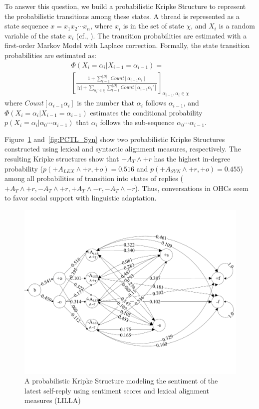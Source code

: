 \documentclass[man,biblatex,floatsintext]{apa6}
\newcommand{\up}{\vspace*{-12pt}}
\begin{document}
To answer this question, we build a probabilistic Kripke Structure to represent the probabilistic transitions among these states.  A thread is represented as a state sequence $x=x_{1}x_{2} \cdots x_{n}$, where $x_{i}$ is in the set of state $\chi$, and $X_{i}$ is a random variable of the state $x_{i}$ (cf.,  \cite{bui2015temporal}). The transition probabilities are estimated with a first-order Markov Model with Laplace correction. Formally, the state transition probabilities are estimated as:
\begin{equation}
\begin{split}
\Phi (X_{i}=\alpha_{i}|X_{i-1}=\alpha_{i-1}) =  \\
\left [ \frac{1+\sum _{l=1}^{|D|} Count \left [ \alpha_{i-1} \alpha_{i} \right ] }{ \left | \chi \right | +\sum_{{\alpha_{i}}' \in \chi } \sum_{l=1}^{|D|} Count \left [ \alpha_{i-1}{\alpha_{i}}' \right ] } \right ]_{\alpha_{i-1},\alpha_{i} \in \chi}
\end{split}
\end{equation}
where $Count \left[ \alpha_{i-1}\alpha_{i} \right]$ is the number that $\alpha_{i}$ follows $\alpha_{i-1}$, and $\Phi (X_{i}=\alpha_{i}|X_{i-1}=\alpha_{i-1})$ estimates the conditional probability $p(X_{i}=\alpha_{i}|\alpha_{0} \cdots \alpha_{i-1})$ that $\alpha_{i}$ follows the sub-sequence $\alpha_{0} \cdots \alpha_{i-1}$.

Figure~\ref{fig:PCTL_Lex} and~\ref{fig:PCTL_Syn} show two probabilistic Kripke Structures constructed using lexical and syntactic alignment measures, respectively. The resulting Kripke structures show that $+A_T\wedge+r$ has the highest in-degree probability ($p(+A_{LEX}\wedge+r,+o)=0.516$ and $p(+A_{SYN}\wedge+r,+o)=0.455$) among all  probabilities of transition into states of replies ($+A_T\wedge+r,-A_T\wedge+r,+A_T\wedge-r,-A_T\wedge-r$). Thus, conversations in OHCs seem to favor social support with linguistic adaptation.

\begin{figure}[!htb]
 \centering
  \includegraphics[width=0.99\linewidth]{Figures/model_lex.pdf}
  \caption{A probabilistic Kripke Structure modeling the sentiment of the latest self-reply using sentiment scores and lexical alignment measures (LILLA)}\label{fig:PCTL_Lex}
  \up
\end{figure}
\end{document}
